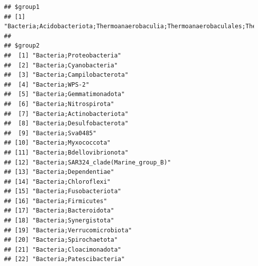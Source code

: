 \documentclass[
]{book}
\begin{document}
\begin{verbatim}
## $group1
## [1] "Bacteria;Acidobacteriota;Thermoanaerobaculia;Thermoanaerobaculales;Thermoanaerobaculaceae;Thermoanaerobaculum"
## 
## $group2
##  [1] "Bacteria;Proteobacteria"                                                                              
##  [2] "Bacteria;Cyanobacteria"                                                                               
##  [3] "Bacteria;Campilobacterota"                                                                            
##  [4] "Bacteria;WPS-2"                                                                                       
##  [5] "Bacteria;Gemmatimonadota"                                                                             
##  [6] "Bacteria;Nitrospirota"                                                                                
##  [7] "Bacteria;Actinobacteriota"                                                                            
##  [8] "Bacteria;Desulfobacterota"                                                                            
##  [9] "Bacteria;Sva0485"                                                                                     
## [10] "Bacteria;Myxococcota"                                                                                 
## [11] "Bacteria;Bdellovibrionota"                                                                            
## [12] "Bacteria;SAR324_clade(Marine_group_B)"                                                                
## [13] "Bacteria;Dependentiae"                                                                                
## [14] "Bacteria;Chloroflexi"                                                                                 
## [15] "Bacteria;Fusobacteriota"                                                                              
## [16] "Bacteria;Firmicutes"                                                                                  
## [17] "Bacteria;Bacteroidota"                                                                                
## [18] "Bacteria;Synergistota"                                                                                
## [19] "Bacteria;Verrucomicrobiota"                                                                           
## [20] "Bacteria;Spirochaetota"                                                                               
## [21] "Bacteria;Cloacimonadota"                                                                              
## [22] "Bacteria;Patescibacteria"                                                                             

\end{verbatim}
\end{document}
